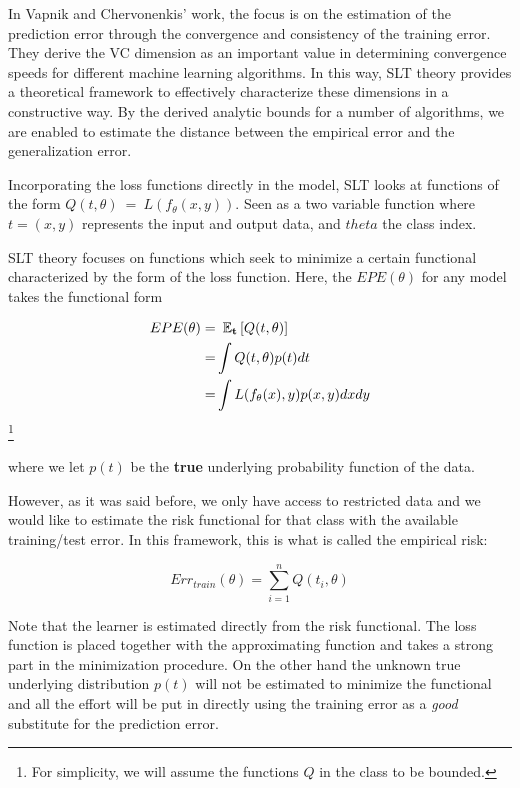 In Vapnik and Chervonenkis' work, the focus is on the estimation of the prediction error through the convergence and consistency of the training error. They derive the VC dimension as an important value in determining convergence speeds for different machine learning algorithms. In this way, SLT theory provides a theoretical framework to effectively characterize these dimensions in a constructive way. By the derived analytic bounds for a number of algorithms, we are enabled to estimate the distance between the empirical error and the generalization error.

Incorporating the loss functions directly in the model, SLT looks at functions of the form $Q(t,\theta) \ = \ L(f_\theta(x,y))$. Seen as a two variable function where $t=(x,y)$ represents the input and output data, and $theta$ the class index.

SLT theory focuses on functions which seek to minimize a certain functional characterized by the form of the loss function. Here, the $EPE(\theta)$ for any model takes the functional form

\begin{equation}\label{vapnik-risk}
\begin{split}
EPE(\theta) = & \ \operatorname{\mathbb{E}}_{\textbf{t}} \left[  Q(t,\theta) \right]\\
= & \int Q(t,\theta) p(t) dt  \\
= & \int L(f_\theta(x),y) p(x,y) dx dy
\end{split}
\end{equation}\footnote{For simplicity, we will assume the functions $Q$ in the class to be bounded.}

where we let $p(t)$ be the \textbf{true} underlying probability function of the data.

However, as it was said before, we only have access to restricted data and we would like to estimate the risk functional for that class with the available training/test error. In this framework, this is what is called the empirical risk:

\begin{equation}\label{vapnik-empiricalRisk}
Err_{train}(\theta) =  \sum_{i=1}^n Q(t_i,\theta)
\end{equation}

Note that the learner is estimated directly from the risk functional. The loss function is placed together with the approximating function and takes a strong part in the minimization procedure. On the other hand the unknown true underlying distribution $p(t)$ will not be estimated to minimize the functional and all the effort will be put in directly using the training error as a \textit{good} substitute for the prediction error.


